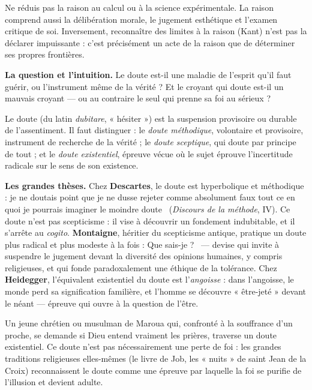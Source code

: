 \documentclass[11pt]{article}
\newcommand{\cle}[1]{{\popxbold\color{popdark}#1}}
\newcounter{popsec}
\newcounter{popsub}
\newcommand{\courssub}[1]{%
  \stepcounter{popsub}%
  \par\vspace{9pt}\noindent{\popxbold\fontsize{11.5}{13}\selectfont\color{popink}{\color{poporange}\thepopsec.\thepopsub}\hspace{6pt}#1}\par\nopagebreak\vspace{4pt}
}
\begin{document}
\begin{attention}
Ne réduis pas la raison au calcul ou à la science expérimentale. La raison comprend aussi la délibération morale, le jugement esthétique et l'examen critique de soi. Inversement, reconnaître des limites à la raison (Kant) n'est pas la déclarer impuissante : c'est précisément un acte de la raison que de déterminer ses propres frontières.
\end{attention}

\courssub{Le doute : méthode et épreuve existentielle}

\textbf{La question et l'intuition.} Le doute est-il une maladie de l'esprit qu'il faut guérir, ou l'instrument même de la vérité ? Et le croyant qui doute est-il un mauvais croyant — ou au contraire le seul qui prenne sa foi au sérieux ?

\begin{definition}[Doute]
Le \cle{doute} (du latin \emph{dubitare}, « hésiter ») est la suspension provisoire ou durable de l'assentiment. Il faut distinguer : le \emph{doute méthodique}, volontaire et provisoire, instrument de recherche de la vérité ; le \emph{doute sceptique}, qui doute par principe de tout ; et le \emph{doute existentiel}, épreuve vécue où le sujet éprouve l'incertitude radicale sur le sens de son existence.
\end{definition}

\textbf{Les grandes thèses.} Chez \textbf{Descartes}, le doute est hyperbolique et méthodique : \guillemotleft je ne doutais point que je ne dusse rejeter comme absolument faux tout ce en quoi je pourrais imaginer le moindre doute \guillemotright\ (\emph{Discours de la méthode}, IV). Ce doute n'est pas scepticisme : il vise à découvrir un fondement indubitable, et il s'arrête au \emph{cogito}. \textbf{Montaigne}, héritier du scepticisme antique, pratique un doute plus radical et plus modeste à la fois : \guillemotleft Que sais-je ? \guillemotright\ — devise qui invite à suspendre le jugement devant la diversité des opinions humaines, y compris religieuses, et qui fonde paradoxalement une éthique de la tolérance. Chez \textbf{Heidegger}, l'équivalent existentiel du doute est l'\emph{angoisse} : dans l'angoisse, le monde perd sa signification familière, et l'homme se découvre « être-jeté » devant le néant — épreuve qui ouvre à la question de l'être.

\begin{exemplebox}
Un jeune chrétien ou musulman de Maroua qui, confronté à la souffrance d'un proche, se demande si Dieu entend vraiment les prières, traverse un doute existentiel. Ce doute n'est pas nécessairement une perte de foi : les grandes traditions religieuses elles-mêmes (le livre de Job, les « nuits » de saint Jean de la Croix) reconnaissent le doute comme une épreuve par laquelle la foi se purifie de l'illusion et devient adulte.
\end{exemplebox}
\end{document}
